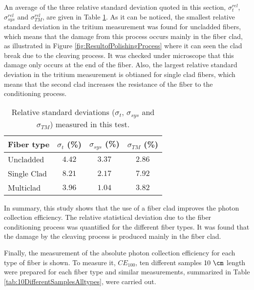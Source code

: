 An average of the three relative standard deviation quoted in this section, $\sigma^{rel}_{t}$, $\sigma^{rel}_{sys}$ and $\sigma^{rel}_{TM}$,  are given in Table \ref{tab:RelativeStandardDeviations}. As it can be noticed, the smallest relative standard deviation in the tritium measurement was found for uncladded fibers, which means that the damage from this process occurs mainly in the fiber clad, as illustrated in Figure \ref{fig:ResultofPolishingProcess} where it can seen the clad break due to the cleaving process. It was checked under microscope that this damage only occurs at the end of the fiber. Also, the largest relative standard deviation in the tritium measurement is obtianed for single clad fibers, which means that the second clad increases the resistance of the fiber to the conditioning process.

\begin{table}[htbp]
\centering{}%
\begin{tabular}{lccc}
\toprule 
Fiber type & $\sigma_t$ (\%) & $\sigma_{sys}$ (\%) & $\sigma_{TM}$ (\%) \tabularnewline
\midrule
\midrule 
Uncladded & $4.42$ & $3.37$ & $2.86$ \tabularnewline
Single Clad & $8.21$ & $2.17$ & $7.92$ \tabularnewline
Multiclad & $3.96$ & $1.04$ & $3.82$ \tabularnewline
\bottomrule
\end{tabular}
\caption{Relative standard deviations ($\sigma_t$, $\sigma_{sys}$ and $\sigma_{TM}$) measured in this test.}
\label{tab:RelativeStandardDeviations}
\end{table}

In summary, this study shows that the use of a fiber clad improves the photon collection efficiency. The relative statistical deviation due to the fiber conditioning process was quantified for the different fiber types. It was found that the damage by the cleaving process is produced mainly in the fiber clad. %

Finally, the measurement of the absolute photon collection efficiency for each type of fiber is shown. To measure it, $CE_{100}$, ten different samples $10~\cm$ length were prepared for each fiber type and similar measurements, summarized in Table \ref{tab:10DifferentSamplesAlltypes}, were carried out.


